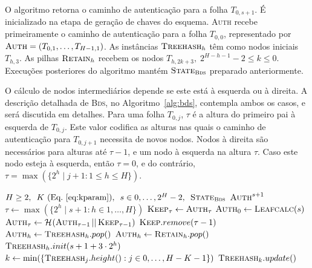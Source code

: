 \documentclass{ufsctex/ufsctex}
\newcommand{\hash}[2][]{\mathcal{H}^{#1} (#2)}
\newcommand{\concat}{\, \vert{} \vert{} \,}
\newcommand{\bds}{\textsc{Bds}}
\begin{document}
O algoritmo retorna o caminho de autenticação para a folha $T_{0, s + 1}$. É
inicializado na etapa de geração de chaves do esquema. \textsc{Auth} recebe
primeiramente o caminho de autenticação para a folha $T_{0, 0}$, representado
por $\textsc{Auth} = (T_{0, 1}, \dots, T_{H - 1, 1})$. As instâncias
$\textsc{Treehash}_{h}$ têm como nodos iniciais $T_{h, 3}$. As pilhas
$\textsc{Retain}_{h}$ recebem os nodos $T_{h, 2k + 3}, \; 2^{H - h - 1} - 2
\leq k \leq 0$. Execuções posteriores do algoritmo mantém
$\textsc{State}_{\bds{}}$ preparado anteriormente.

O cálculo de nodos intermediários depende se este está à esquerda ou à direita.
A descrição detalhada de \bds{}, no Algoritmo~\ref{alg:bds}, contempla ambos os
casos, e será discutida em detalhes. Para uma folha $T_{0, j}$, $\tau$ é a
altura do primeiro pai à esquerda de $T_{0, j}$. Este valor codifica as alturas
nas quais o caminho de autenticação para $T_{0, j + 1}$ necessita de novos
nodos. Nodos à direita são necessários para alturas até $\tau - 1$, e um nodo à
esquerda na altura $\tau$. Caso este nodo esteja à esquerda, então $\tau = 0$,
e do contrário, $\tau = \max(\{2^{h} \mid j + 1 : 1 \leq h \leq H\})$.

\begin{algorithm}
  \begin{algorithmic}
    \REQUIRE{} {$H \geq 2, \enspace K~(\text{Eq.}~\ref{eq:kparam}), \enspace
      s \in {0, \dots, 2^{H} - 2}, \enspace \textsc{State}_{\bds{}}$}
    \ENSURE{} {$\textsc{Auth}^{s + 1}$}
    \STATE{}  $\tau \leftarrow \max(\{2^{h} \mid s + 1 : h \in 1, \dots, H\})$
      \STATE{}  $\textsc{Keep}_{\tau} \leftarrow \textsc{Auth}_{\tau}$
    \ENDIF{}
      \STATE{}  $\textsc{Auth}_{0} \leftarrow \textsc{Leafcalc}(s)$
      \STATE{}  $\textsc{Auth}_{\tau} \leftarrow
        \hash{\textsc{Auth}_{\tau - 1} \concat \textsc{Keep}_{\tau - 1}}$
      \STATE{}  $\textsc{Keep}.remove(\tau - 1)$
          \STATE{}  $\textsc{Auth}_{h} \leftarrow \textsc{Treehash}_{h}.pop()$
        \ELSE{}
          \STATE{}  $\textsc{Auth}_{h} \leftarrow \textsc{Retain}_{h}.pop()$
        \ENDIF{}
      \ENDFOR{}
          \STATE{}  $\textsc{Treehash}_{h}.init(s + 1 + 3 \cdot 2^{h})$
        \ENDIF{}
      \ENDFOR{}
    \ENDIF{}
      \STATE{}  $k \leftarrow \min(\{
        \textsc{Treehash}_{j}.height() : j \in 0, \dots, H - K - 1\})$
      \STATE{}  $\textsc{Treehash}_{k}.update()$
    \ENDFOR{}
  \end{algorithmic}
  \caption{Travessia de árvores de Merkle \bds{}.}\label{alg:bds}
\end{algorithm}
\end{document}
